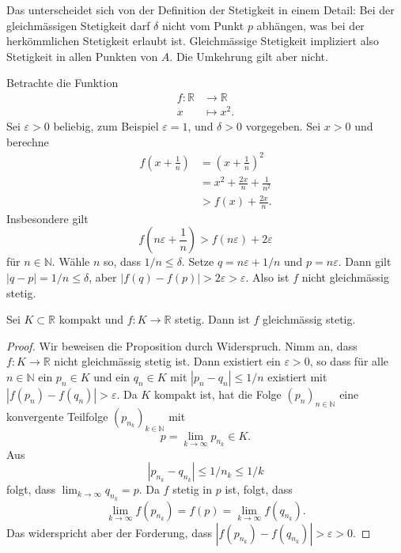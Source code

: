 \documentclass[../main.tex]{subfiles}
\begin{document}
\begin{remark}
  Das unterscheidet sich von der Definition
  der Stetigkeit in einem Detail:
  Bei der gleichmässigen Stetigkeit
  darf $\delta$ nicht vom Punkt $p$ abhängen,
  was bei der herkömmlichen Stetigkeit
  erlaubt ist.
  Gleichmässige Stetigkeit impliziert
  also Stetigkeit in allen Punkten von $A$.
  Die Umkehrung gilt aber nicht.
\end{remark}

\begin{example}
  Betrachte die Funktion
  \begin{align*}
    f \colon \mathbb{R} & \to \mathbb{R} \\
    x & \mapsto x^2.
  \end{align*}
  Sei $\varepsilon > 0$ beliebig,
  zum Beispiel $\varepsilon = 1$, und $\delta > 0$ vorgegeben.  
  Sei $x > 0$ und berechne
  \begin{align*}
    f\left(x + \frac{1}{n}\right) 
    & = {\left(x + \frac{1}{n}\right)}^2 \\
               & = x^2 + \frac{2x}{n} + \frac{1}{n^2} \\
               & > f(x) + \frac{2x}{n}.
  \end{align*}
  Insbesondere gilt
  \[
  f\left(n \varepsilon + \frac{1}{n}\right)
  > f(n \varepsilon) + 2 \varepsilon
  \]
  für $n \in \mathbb{N}$. Wähle
  $n$ so, dass $1/n \leq \delta$.
  Setze $q = n\varepsilon + 1/n$ 
  und $p = n\varepsilon$.
  Dann gilt $|q - p| = 1/n \leq \delta$,
  aber
  $|f(q) - f(p)| > 2 \varepsilon > \varepsilon$.
  Also ist $f$ nicht gleichmässig stetig.
\end{example}

\begin{proposition}
  Sei $K \subset \mathbb{R}$ kompakt
  und $f \colon K \to \mathbb{R}$ stetig.
  Dann ist $f$ gleichmässig stetig.
\end{proposition}

\begin{proof}
  Wir beweisen die Proposition durch Widerspruch.
  Nimm an, dass $f \colon K \to \mathbb{R}$ nicht
  gleichmässig stetig ist.
  Dann existiert ein $\varepsilon > 0$,
  so dass für alle $n \in \mathbb{N}$ 
  ein $p_n \in K$ und ein $q_n \in K$ mit
  $|p_n - q_n| \leq 1/n$ existiert
  mit $
    |f(p_n) - f(q_n)| > \varepsilon$.
  Da $K$ kompakt ist,
  hat die Folge ${(p_{n})}_{n \in \mathbb{N}}$ 
  eine konvergente Teilfolge
  ${(p_{n_k})}_{k \in \mathbb{N}}$ 
  mit
  \[
    p = \lim_{k \to \infty}p_{n_k} \in K.
  \]
  Aus
  \[
    |p_{n_k} - q_{n_k}| \leq 1/n_k \leq 1/k
  \]
  folgt, dass
  $
    \lim_{k \to \infty} q_{n_k} = p
    $.
  Da $f$ stetig in $p$ ist, folgt, dass
  \[
    \lim_{k \to \infty} f(p_{n_k}) 
    = f(p) 
    = \lim_{k \to \infty} f(q_{n_k}).
  \]
  Das widerspricht aber der Forderung,
  dass $|f(p_{n_k}) - f(q_{n_k})| > \varepsilon > 0$.
\end{proof}
\end{document}
